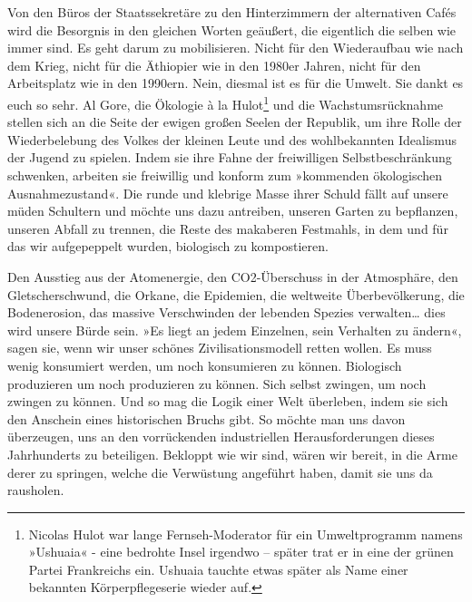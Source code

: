 Von den Büros der Staatssekretäre zu den Hinterzimmern der
alternativen Cafés wird die Besorgnis in den gleichen Worten
geäußert, die eigentlich die selben wie immer sind. Es geht darum
zu mobilisieren. Nicht für den Wiederaufbau wie nach dem Krieg,
nicht für die Äthiopier wie in den 1980er Jahren, nicht für den
Arbeitsplatz wie in den 1990ern. Nein, diesmal ist es für die
Umwelt. Sie dankt es euch so sehr. Al Gore, die Ökologie à la
Hulot\footnote{
Nicolas Hulot war lange Fernseh-Moderator für ein Umweltprogramm
namens »Ushuaia« - eine bedrohte Insel irgendwo – später trat er in
eine der grünen Partei Frankreichs ein. Ushuaia tauchte etwas
später als Name einer bekannten Körperpflegeserie wieder auf.
}%
und die Wachstumsrücknahme stellen sich an die Seite der
ewigen großen Seelen der Republik, um ihre Rolle der Wiederbelebung
des Volkes der kleinen Leute und des wohlbekannten Idealismus der
Jugend zu spielen. Indem sie ihre Fahne der freiwilligen
Selbstbeschränkung schwenken, arbeiten sie freiwillig und konform
zum »kommenden ökologischen Ausnahmezustand«. Die runde und
klebrige Masse ihrer Schuld fällt auf unsere müden Schultern und
möchte uns dazu antreiben, unseren Garten zu bepflanzen, unseren
Abfall zu trennen, die Reste des makaberen Festmahls, in dem und
für das wir aufgepeppelt wurden, biologisch zu kompostieren.

Den Ausstieg aus der Atomenergie, den CO2-Überschuss in der
Atmosphäre, den Gletscherschwund, die Orkane, die Epidemien, die
weltweite Überbevölkerung, die Bodenerosion, das massive
Verschwinden der lebenden Spezies verwalten\ldots{} dies wird unsere
Bürde sein. »Es liegt an jedem Einzelnen, sein Verhalten zu
ändern«, sagen sie, wenn wir unser schönes Zivilisationsmodell
retten wollen. Es muss wenig konsumiert werden, um noch konsumieren
zu können. Biologisch produzieren um noch produzieren zu können.
Sich selbst zwingen, um noch zwingen zu können. Und so mag die
Logik einer Welt überleben, indem sie sich den Anschein eines
historischen Bruchs gibt. So möchte man uns davon überzeugen, uns
an den vorrückenden industriellen Herausforderungen dieses
Jahrhunderts zu beteiligen. Bekloppt wie wir sind, wären wir
bereit, in die Arme derer zu springen, welche die Verwüstung
angeführt haben, damit sie uns da rausholen.

\extrapar{}


